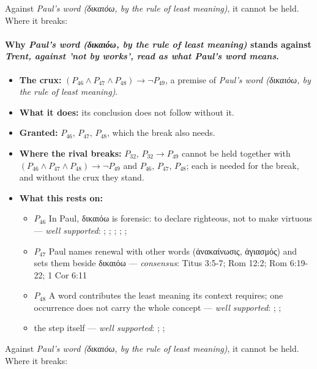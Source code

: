 \documentclass[11pt]{article}
\begin{document}
Against \emph{Paul's word (δικαιόω, by the rule of least meaning)}, it cannot be held. Where it breaks:
\paragraph{Why \emph{Paul's word (δικαιόω, by the rule of least meaning)} stands against \emph{Trent, against 'not by works', read as what Paul's word means}.}
\begin{itemize}
\item \textbf{The crux:} \((P_{46} \land P_{47} \land P_{48}) \rightarrow \lnot P_{49}\), a premise of \emph{Paul's word (δικαιόω, by the rule of least meaning)}.
\item \textbf{What it does:} its conclusion does not follow without it.
\item \textbf{Granted:} \(P_{46}\), \(P_{47}\), \(P_{48}\), which the break also needs.
\item \textbf{Where the rival breaks:} \(P_{32}\), \(P_{32} \rightarrow P_{49}\) cannot be held together with \((P_{46} \land P_{47} \land P_{48}) \rightarrow \lnot P_{49}\) and \(P_{46}\), \(P_{47}\), \(P_{48}\); each is needed for the break, and without the crux they stand.
\item \textbf{What this rests on:}
\begin{itemize}
\item \(P_{46}\) In Paul, δικαιόω is forensic: to declare righteous, not to make virtuous --- \emph{well supported}: \cite[s.v. δικαιόω]{bauer-danker-lexicon-2000}; \cite{morris-apostolic-preaching-1965}; \cite[p. 80]{moo-romans-1996}; \cite{irons-righteousness-of-god-2015}; \cite{wright-justification-2009}; \cite[ad loc. Rom 3:24]{fitzmyer-romans-1993}
\item \(P_{47}\) Paul names renewal with other words (ἀνακαίνωσις, ἁγιασμός) and sets them beside δικαιόω --- \emph{consensus}: Titus 3:5-7; Rom 12:2; Rom 6:19-22; 1 Cor 6:11
\item \(P_{48}\) A word contributes the least meaning its context requires; one occurrence does not carry the whole concept --- \emph{well supported}: \cite{silva-biblical-words-1994}; \cite{joos-semantic-axiom-1972}; \cite{barr-semantics-2004}
\item the step itself --- \emph{well supported}: \cite{silva-biblical-words-1994}; \cite[p. 80]{moo-romans-1996}; \cite{barr-semantics-2004}
\end{itemize}
\end{itemize}
Against \emph{Paul's word (δικαιόω, by the rule of least meaning)}, it cannot be held. Where it breaks:
\end{document}
